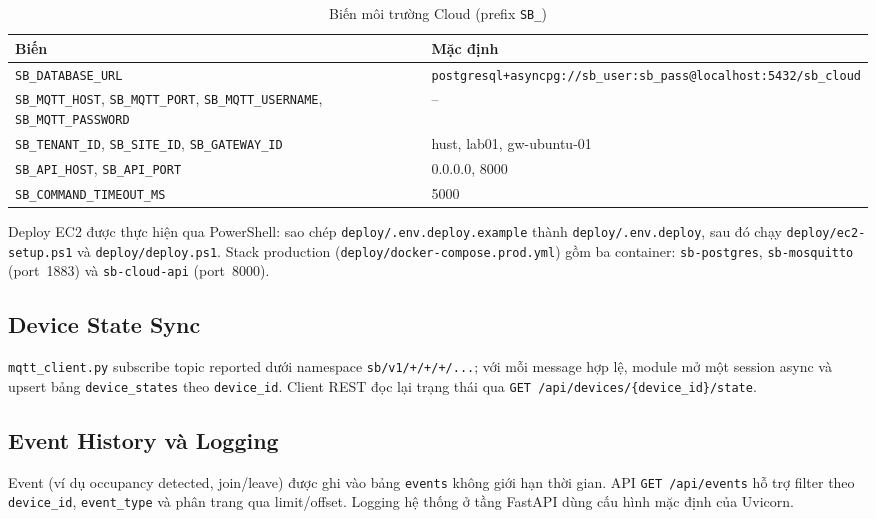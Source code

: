 \begin{table}[H]
\centering
\caption{Biến môi trường Cloud (prefix \texttt{SB\_})}
\label{tab:ch3-cloud-env}
\begin{tabular}{|l|p{8cm}|}
\hline
\textbf{Biến} & \textbf{Mặc định} \\ \hline
\texttt{SB\_DATABASE\_URL} & \texttt{postgresql+asyncpg://sb\_user:sb\_pass@localhost:5432/sb\_cloud} \\ \hline
\texttt{SB\_MQTT\_HOST}, \texttt{SB\_MQTT\_PORT}, \texttt{SB\_MQTT\_USERNAME}, \texttt{SB\_MQTT\_PASSWORD} & -- \\ \hline
\texttt{SB\_TENANT\_ID}, \texttt{SB\_SITE\_ID}, \texttt{SB\_GATEWAY\_ID} & hust, lab01, gw-ubuntu-01 \\ \hline
\texttt{SB\_API\_HOST}, \texttt{SB\_API\_PORT} & 0.0.0.0, 8000 \\ \hline
\texttt{SB\_COMMAND\_TIMEOUT\_MS} & 5000 \\ \hline
\end{tabular}
\end{table}

Deploy EC2 được thực hiện qua PowerShell: sao chép
\texttt{deploy/.env.deploy.example} thành
\texttt{deploy/.env.deploy}, sau đó chạy
\texttt{deploy/ec2-setup.ps1} và \texttt{deploy/deploy.ps1}. Stack
production (\texttt{deploy/docker-compose.prod.yml}) gồm ba container:
\texttt{sb-postgres}, \texttt{sb-mosquitto} (port~1883) và
\texttt{sb-cloud-api} (port~8000).

\subsection{Device State Sync}
\label{sec:ch3-device-sync}

\texttt{mqtt\_client.py} subscribe topic reported dưới namespace
\texttt{sb/v1/+/+/+/...}; với mỗi message hợp lệ, module mở một
session async và upsert bảng \texttt{device\_states} theo
\texttt{device\_id}. Client REST đọc lại trạng thái qua
\texttt{GET /api/devices/\{device\_id\}/state}.

\subsection{Event History và Logging}
\label{sec:ch3-event-history}

Event (ví dụ occupancy detected, join/leave) được ghi vào bảng
\texttt{events} không giới hạn thời gian. API
\texttt{GET /api/events} hỗ trợ filter theo \texttt{device\_id},
\texttt{event\_type} và phân trang qua limit/offset. Logging hệ thống
ở tầng FastAPI dùng cấu hình mặc định của Uvicorn.

